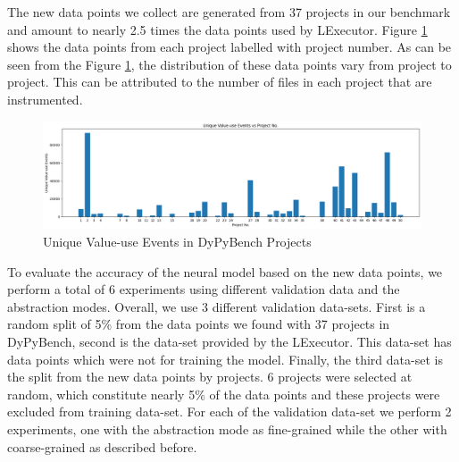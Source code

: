 The new data points we collect are generated from 37 projects in our benchmark and amount to nearly 2.5 times the data points used by LExecutor.
Figure \ref{fig:Lex_projects_events} shows the data points from each project labelled with project number.
As can be seen from the Figure \ref{fig:Lex_projects_events}, the distribution of these data points vary from project to project.
This can be attributed to the number of files in each project that are instrumented. 
\begin{figure}[ht]
    \centering
    \includegraphics[width=1\linewidth]{figures/evaluation/lex_data_points.png}
    \caption[Unique Value-use Events]{\label{fig:Lex_projects_events}Unique Value-use Events in DyPyBench Projects}
\end{figure}

To evaluate the accuracy of the neural model based on the new data points, we perform a total of 6 experiments using different validation data and the abstraction modes.
Overall, we use 3 different validation data-sets.
First is a random split of 5\% from the data points we found with 37 projects in DyPyBench, second is the data-set provided by the LExecutor. This data-set has data points which were not for training the model.
Finally, the third data-set is the split from the new data points by projects. 6 projects were selected at random, which constitute nearly 5\% of the data points and these projects were excluded from 
training data-set.
For each of the validation data-set we perform 2 experiments, one with the abstraction mode as fine-grained while the other with coarse-grained as described before.

